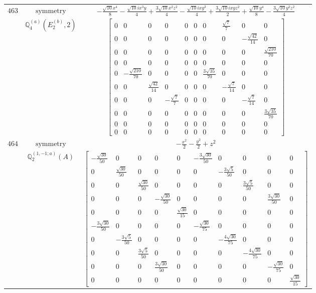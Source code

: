 \documentclass[fleqn,8pt,landscape]{jsarticle}
\begin{document}
\begin{longtable}{ccc}
$ 463 $ & $ \text{symmetry} $ & $ - \frac{\sqrt{10} x^{4}}{8} - \frac{\sqrt{10} i x^{3} y}{4} + \frac{3 \sqrt{10} x^{2} z^{2}}{4} - \frac{\sqrt{10} i x y^{3}}{4} + \frac{3 \sqrt{10} i x y z^{2}}{2} + \frac{\sqrt{10} y^{4}}{8} - \frac{3 \sqrt{10} y^{2} z^{2}}{4} $ \\
$  $ & $ \mathbb{Q}_{4}^{(a)}(E_{2}^{(b)},2) $ & $ \begin{bmatrix} 0 & 0 & 0 & 0 & 0 & 0 & 0 & \frac{\sqrt{7}}{7} & 0 & 0 \\ 0 & 0 & 0 & 0 & 0 & 0 & 0 & 0 & - \frac{\sqrt{42}}{14} & 0 \\ 0 & 0 & 0 & 0 & 0 & 0 & 0 & 0 & 0 & \frac{\sqrt{210}}{70} \\ 0 & 0 & 0 & 0 & 0 & 0 & 0 & 0 & 0 & 0 \\ 0 & - \frac{\sqrt{210}}{70} & 0 & 0 & 0 & 0 & \frac{3 \sqrt{35}}{70} & 0 & 0 & 0 \\ 0 & 0 & \frac{\sqrt{42}}{14} & 0 & 0 & 0 & 0 & - \frac{\sqrt{7}}{14} & 0 & 0 \\ 0 & 0 & 0 & - \frac{\sqrt{7}}{7} & 0 & 0 & 0 & 0 & - \frac{\sqrt{7}}{14} & 0 \\ 0 & 0 & 0 & 0 & 0 & 0 & 0 & 0 & 0 & \frac{3 \sqrt{35}}{70} \\ 0 & 0 & 0 & 0 & 0 & 0 & 0 & 0 & 0 & 0 \\ 0 & 0 & 0 & 0 & 0 & 0 & 0 & 0 & 0 & 0 \end{bmatrix} $ \\ \hline
$ 464 $ & $ \text{symmetry} $ & $ - \frac{x^{2}}{2} - \frac{y^{2}}{2} + z^{2} $ \\
$  $ & $ \mathbb{Q}_{2}^{(1,-1;a)}(A) $ & $ \begin{bmatrix} - \frac{\sqrt{30}}{50} & 0 & 0 & 0 & 0 & - \frac{3 \sqrt{30}}{50} & 0 & 0 & 0 & 0 \\ 0 & \frac{\sqrt{30}}{50} & 0 & 0 & 0 & 0 & - \frac{3 \sqrt{5}}{50} & 0 & 0 & 0 \\ 0 & 0 & \frac{\sqrt{30}}{50} & 0 & 0 & 0 & 0 & \frac{3 \sqrt{5}}{50} & 0 & 0 \\ 0 & 0 & 0 & - \frac{\sqrt{30}}{50} & 0 & 0 & 0 & 0 & \frac{3 \sqrt{30}}{50} & 0 \\ 0 & 0 & 0 & 0 & \frac{\sqrt{30}}{15} & 0 & 0 & 0 & 0 & 0 \\ - \frac{3 \sqrt{30}}{50} & 0 & 0 & 0 & 0 & - \frac{\sqrt{30}}{75} & 0 & 0 & 0 & 0 \\ 0 & - \frac{3 \sqrt{5}}{50} & 0 & 0 & 0 & 0 & - \frac{4 \sqrt{30}}{75} & 0 & 0 & 0 \\ 0 & 0 & \frac{3 \sqrt{5}}{50} & 0 & 0 & 0 & 0 & - \frac{4 \sqrt{30}}{75} & 0 & 0 \\ 0 & 0 & 0 & \frac{3 \sqrt{30}}{50} & 0 & 0 & 0 & 0 & - \frac{\sqrt{30}}{75} & 0 \\ 0 & 0 & 0 & 0 & 0 & 0 & 0 & 0 & 0 & \frac{\sqrt{30}}{15} \end{bmatrix} $ \\ \hline

\end{longtable}
\end{document}
